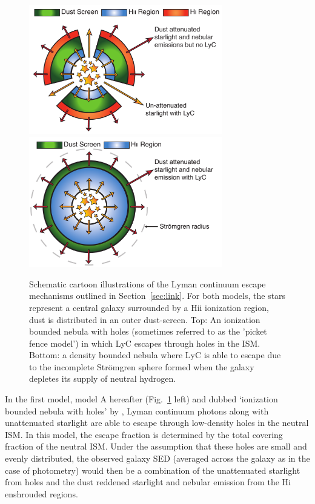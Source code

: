 \begin{figure}
\centering
  \includegraphics[width=0.75\textwidth]{plots/Fig1a.pdf}\vspace{2cm}	
  \includegraphics[width=0.75\textwidth]{plots/Fig1b.pdf}

  \caption[Schematic cartoon illustrations of the Lyman continuum escape mechanisms outlined in Section~\ref{sec:link}.]{Schematic cartoon illustrations of the Lyman continuum escape mechanisms outlined in Section~\ref{sec:link}. For both models, the stars represent a central galaxy surrounded by a {\sc Hii} ionization region, dust is distributed in an outer dust-screen. Top: An ionization bounded nebula with holes (sometimes referred to as the 'picket fence model') in which LyC escapes through holes in the ISM. Bottom: a density bounded nebula where LyC is able to escape due to the incomplete Str{\"o}mgren sphere formed when the galaxy depletes its supply of neutral hydrogen.}
  \label{fig:mechanisms}
\end{figure}

In the first model, model A hereafter (Fig.~\ref{fig:mechanisms} left) and dubbed `ionization bounded nebula with holes' by \citeauthor{Zackrisson:2013iz}, Lyman continuum photons along with unattenuated starlight are able to escape through low-density holes in the neutral ISM. In this model, the escape fraction is determined by the total covering fraction of the neutral ISM. Under the assumption that these holes are small and evenly distributed, the observed galaxy SED (averaged across the galaxy as in the case of photometry) would then be a combination of the unattenuated starlight from holes and the dust reddened starlight and nebular emission from the H{\sc i} enshrouded regions.

